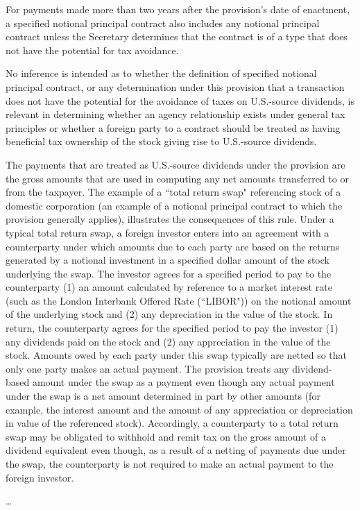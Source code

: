 \begin{select}
For payments made more than two years after the provision's date of enactment, a specified notional principal contract also includes any notional principal contract unless the Secretary determines that the contract is of a type that does not have the potential for tax avoidance.

No inference is intended as to whether the definition of specified notional principal contract, or any determination under this provision that a transaction does not have the potential for the avoidance of taxes on U.S.-source dividends, is relevant in determining whether an agency relationship exists under general tax principles or whether a foreign party to a contract should be treated as having beneficial tax ownership of the stock giving rise to U.S.-source dividends.

The payments that are treated as U.S.-source dividends under the provision are the gross amounts that are used in computing any net amounts transferred to or from the taxpayer. The example of a ``total return swap" referencing stock of a domestic corporation (an example of a notional principal contract to which the provision generally applies), illustrates the consequences of this rule. Under a typical total return swap, a foreign investor enters into an agreement with a counterparty under which amounts due to each party are based on the returns generated by a notional investment in a specified dollar amount of the stock underlying the swap. The investor agrees for a specified period to pay to the counterparty (1) an amount calculated by reference to a market interest rate (such as the London Interbank Offered Rate (``LIBOR")) on the notional amount of the underlying stock and (2) any depreciation in the value of the stock. In return, the counterparty agrees for the specified period to pay the investor (1) any dividends paid on the stock and (2) any appreciation in the value of the stock. Amounts owed by each party under this swap typically are netted so that only one party makes an actual payment. The provision treats any dividend-based amount under the swap as a payment even though any actual payment under the swap is a net amount determined in part by other amounts (for example, the interest amount and the amount of any appreciation or depreciation in value of the referenced stock). Accordingly, a counterparty to a total return swap may be obligated to withhold and remit tax on the gross amount of a dividend equivalent even though, as a result of a netting of payments due under the swap, the counterparty is not required to make an actual payment to the foreign investor.

\ldots

\end{select}

